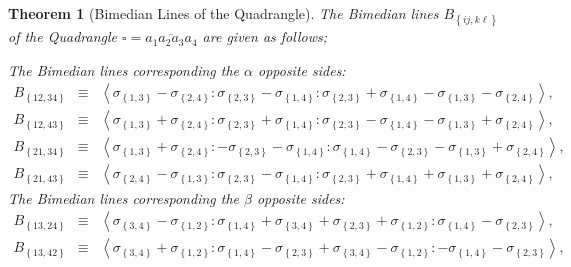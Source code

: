 \documentclass{unswthesis}
\newtheorem{theorem}{Theorem}
\begin{document}
\begin{theorem}[Bimedian Lines of the Quadrangle]
The Bimedian lines $B_{\left\{ ij,k\ell \right\} }$ of the Quadrangle $%
\square =\overline{a_{1}a_{2}a_{3}a_{4}}$ are given as follows;

The Bimedian lines corresponding the $\alpha $ opposite sides:%
\begin{eqnarray*}
B_{\left\{ 12,34\right\} } &\equiv &\left\langle \sigma _{\left\{
1,3\right\} }-\sigma _{\left\{ 2,4\right\} }:\sigma _{\left\{ 2,3\right\}
}-\sigma _{\left\{ 1,4\right\} }:\sigma _{\left\{ 2,3\right\} }+\sigma
_{\left\{ 1,4\right\} }-\sigma _{\left\{ 1,3\right\} }-\sigma _{\left\{
2,4\right\} }\right\rangle , \\
B_{\left\{ 12,43\right\} } &\equiv &\left\langle \sigma _{\left\{
1,3\right\} }+\sigma _{\left\{ 2,4\right\} }:\sigma _{\left\{ 2,3\right\}
}+\sigma _{\left\{ 1,4\right\} }:\sigma _{\left\{ 2,3\right\} }-\sigma
_{\left\{ 1,4\right\} }-\sigma _{\left\{ 1,3\right\} }+\sigma _{\left\{
2,4\right\} }\right\rangle , \\
B_{\left\{ 21,34\right\} } &\equiv &\left\langle \sigma _{\left\{
1,3\right\} }+\sigma _{\left\{ 2,4\right\} }:-\sigma _{\left\{ 2,3\right\}
}-\sigma _{\left\{ 1,4\right\} }:\sigma _{\left\{ 1,4\right\} }-\sigma
_{\left\{ 2,3\right\} }-\sigma _{\left\{ 1,3\right\} }+\sigma _{\left\{
2,4\right\} }\right\rangle , \\
B_{\left\{ 21,43\right\} } &\equiv &\left\langle \sigma _{\left\{
2,4\right\} }-\sigma _{\left\{ 1,3\right\} }:\sigma _{\left\{ 2,3\right\}
}-\sigma _{\left\{ 1,4\right\} }:\sigma _{\left\{ 2,3\right\} }+\sigma
_{\left\{ 1,4\right\} }+\sigma _{\left\{ 1,3\right\} }+\sigma _{\left\{
2,4\right\} }\right\rangle ,
\end{eqnarray*}%
The Bimedian lines corresponding the $\beta $ opposite sides:%
\begin{eqnarray*}
B_{\left\{ 13,24\right\} } &\equiv &\left\langle \sigma _{\left\{
3,4\right\} }-\sigma _{\left\{ 1,2\right\} }:\sigma _{\left\{ 1,4\right\}
}+\sigma _{\left\{ 3,4\right\} }+\sigma _{\left\{ 2,3\right\} }+\sigma
_{\left\{ 1,2\right\} }:\sigma _{\left\{ 1,4\right\} }-\sigma _{\left\{
2,3\right\} }\right\rangle , \\
B_{\left\{ 13,42\right\} } &\equiv &\left\langle \sigma _{\left\{
3,4\right\} }+\sigma _{\left\{ 1,2\right\} }:\sigma _{\left\{ 1,4\right\}
}-\sigma _{\left\{ 2,3\right\} }+\sigma _{\left\{ 3,4\right\} }-\sigma
_{\left\{ 1,2\right\} }:-\sigma _{\left\{ 1,4\right\} }-\sigma _{\left\{
2,3\right\} }\right\rangle , \\

\end{eqnarray*}
\end{theorem}
\end{document}
